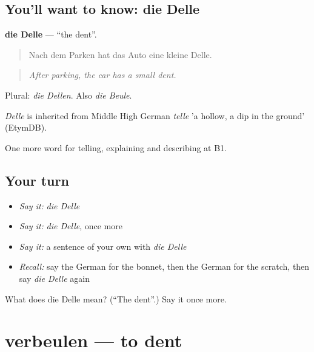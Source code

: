 \subsection*{You'll want to know: die Delle}
\textbf{die Delle} — \textquotedblleft{}the dent\textquotedblright{}.

\begin{quote}
Nach dem Parken hat das Auto eine kleine Delle.
\end{quote}

\begin{quote}
\emph{After parking, the car has a small dent.}
\end{quote}

Plural: \emph{die Dellen}. Also \emph{die Beule}.

\begin{cousinweb}
\emph{Delle} is inherited from Middle High German \emph{telle} 'a hollow, a dip in the ground' (EtymDB).
\end{cousinweb}

\begin{grammarlens}[title={What you've built}]
One more word for telling, explaining and describing at B1.
\end{grammarlens}

\subsection*{Your turn}
\begin{itemize}
\raggedright
  \item \emph{Say it:} \emph{die Delle}
  \item \emph{Say it:} \emph{die Delle}, once more
  \item \emph{Say it:} a sentence of your own with \emph{die Delle}
  \item \emph{Recall:} say the German for the bonnet, then the German for the scratch, then say \emph{die Delle} again
\end{itemize}

\begin{tcolorbox}[breakable,colback=teal!4,colframe=teal!35!black,title={Before you move on}]
What does die Delle mean? (\textquotedblleft{}The dent\textquotedblright{}.) Say it once more.
\end{tcolorbox}
\section[verbeulen]{verbeulen — to dent}

